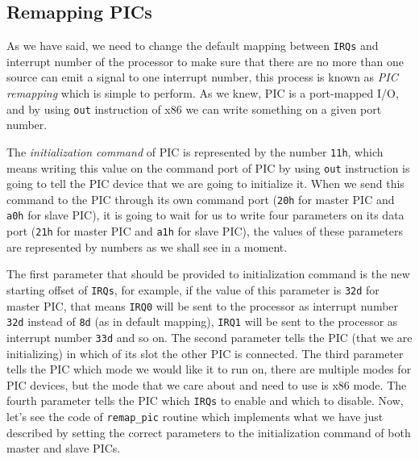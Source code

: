 \subsection{Remapping PICs}\label{remapping-pics}

As we have said, we need to change the default mapping between
\lstinline!IRQs! and interrupt number of the processor to make sure that
there are no more than one source can emit a signal to one interrupt
number, this process is known as \emph{PIC remapping} which is simple to
perform. As we knew, PIC is a port-mapped I/O, and by using
\lstinline!out! instruction of x86 we can write something on a given
port number.

The \emph{initialization command} of PIC is represented by the number
\lstinline!11h!, which means writing this value on the command port of
PIC by using \lstinline!out! instruction is going to tell the PIC device
that we are going to initialize it. When we send this command to the PIC
through its own command port (\lstinline!20h! for master PIC and
\lstinline!a0h! for slave PIC), it is going to wait for us to write four
parameters on its data port (\lstinline!21h! for master PIC and
\lstinline!a1h! for slave PIC), the values of these parameters are
represented by numbers as we shall see in a moment.

The first parameter that should be provided to initialization command is
the new starting offset of \lstinline!IRQs!, for example, if the value
of this parameter is \lstinline!32d! for master PIC, that means
\lstinline!IRQ0! will be sent to the processor as interrupt number
\lstinline!32d! instead of \lstinline!8d! (as in default mapping),
\lstinline!IRQ1! will be sent to the processor as interrupt number
\lstinline!33d! and so on. The second parameter tells the PIC (that we
are initializing) in which of its slot the other PIC is connected. The
third parameter tells the PIC which mode we would like it to run on,
there are multiple modes for PIC devices, but the mode that we care
about and need to use is x86 mode. The fourth parameter tells the PIC
which \lstinline!IRQs! to enable and which to disable. Now, let's see
the code of \lstinline!remap_pic! routine which implements what we have
just described by setting the correct parameters to the initialization
command of both master and slave PICs.

